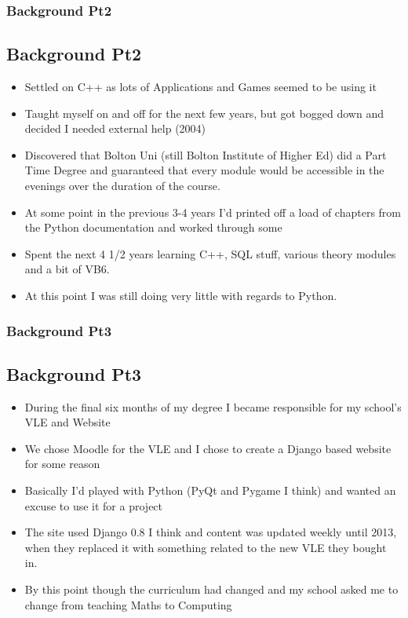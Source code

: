 \documentclass{beamer}
\begin{document}
\begin{frame}
\frametitle{Background Pt2}
\subsection{Background Pt2}

\begin{itemize}

\item Settled on C++ as lots of Applications and Games seemed to be using it

\item Taught myself on and off for the next few years, but got bogged down and decided I needed external help (2004)

\item Discovered that Bolton Uni (still Bolton Institute of Higher Ed) did a Part Time Degree and guaranteed that every
  module would be accessible in the evenings over the duration of the course.

\item At some point in the previous 3-4 years I'd printed off a load of chapters from the Python documentation and
  worked through some

\item Spent the next 4 1/2 years learning C++, SQL stuff, various theory modules and a bit of VB6.

\item At this point I was still doing very little with regards to Python.
\end{itemize}
\end{frame}

\begin{frame}
  \frametitle{Background Pt3}
  \subsection{Background Pt3}

  \begin{itemize}
    
  \item During the final six months of my degree I became responsible for my school's VLE and Website
    
  \item We chose Moodle for the VLE and I chose to create a Django based website for some reason
    
  \item Basically I'd played with Python (PyQt and Pygame I think) and wanted an excuse to use it for a project
    
  \item The site used Django 0.8 I think and content was updated weekly until 2013, when they replaced it with
    something related to the new VLE they bought in.
    
  \item By this point though the curriculum had changed and my school asked me to change from teaching Maths to
    Computing 
  \end{itemize}
\end{frame}
\end{document}

